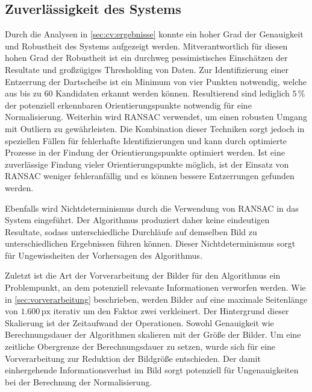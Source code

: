 
\subsection{Zuverlässigkeit des Systems}

Durch die Analysen in \autoref{sec:cv:ergebnisse} konnte ein hoher Grad der Genauigkeit und Robustheit des Systems aufgezeigt werden. Mitverantwortlich für diesen hohen Grad der Robustheit ist ein durchweg pessimistisches Einschätzen der Resultate und großzügiges Thresholding von Daten. Zur Identifizierung einer Entzerrung der Dartscheibe ist ein Minimum von vier Punkten notwendig, welche aus bis zu 60 Kandidaten erkannt werden können. Resultierend sind lediglich $5\,\%$ der potenziell erkennbaren Orientierungspunkte notwendig für eine Normalisierung. Weiterhin wird RANSAC verwendet, um einen robusten Umgang mit Outliern zu gewährleisten. Die Kombination dieser Techniken sorgt jedoch in speziellen Fällen für fehlerhafte Identifizierungen und kann durch optimierte Prozesse in der Findung der Orientierungspunkte optimiert werden. Ist eine zuverlässige Findung vieler Orientierungspunkte möglich, ist der Einsatz von RANSAC weniger fehleranfällig und es können bessere Entzerrungen gefunden werden.

Ebenfalls wird Nichtdeterminismus durch die Verwendung von RANSAC in das System eingeführt. Der Algorithmus produziert daher keine eindeutigen Resultate, sodass unterschiedliche Durchläufe auf demselben Bild zu unterschiedlichen Ergebnissen führen können. Dieser Nichtdeterminismus sorgt für Ungewissheiten der Vorhersagen des Algorithmus.

Zuletzt ist die Art der Vorverarbeitung der Bilder für den Algorithmus ein Problempunkt, an dem potenziell relevante Informationen verworfen werden. Wie in \autoref{sec:vorverarbeitung} beschrieben, werden Bilder auf eine maximale Seitenlänge von $1.600\,\text{px}$ iterativ um den Faktor zwei verkleinert. Der Hintergrund dieser Skalierung ist der Zeitaufwand der Operationen. Sowohl Genauigkeit wie Berechnungsdauer der Algorithmen skalieren mit der Größe der Bilder. Um eine zeitliche Obergrenze der Berechnungsdauer zu setzen, wurde sich für eine Vorverarbeitung zur Reduktion der Bildgröße entschieden. Der damit einhergehende Informationsverlust im Bild sorgt potenziell für Ungenauigkeiten bei der Berechnung der Normalisierung.

